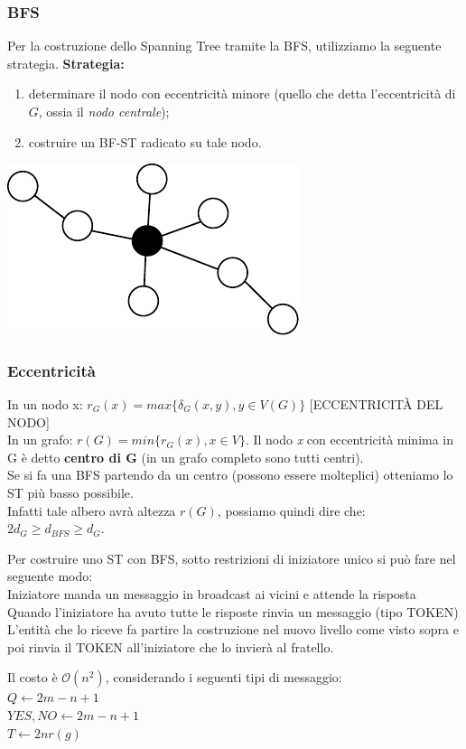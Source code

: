 \subsubsection{BFS}
Per la costruzione dello Spanning Tree tramite la BFS, utilizziamo la seguente
strategia.
\textbf{Strategia:}
\begin{enumerate}
    \item determinare il nodo con eccentricità minore (quello che detta
          l'eccentricità di $G$, ossia il \textit{nodo centrale});
    \item costruire un BF-ST radicato su tale nodo.
\end{enumerate}

\begin{center}
    \includegraphics[scale=1]{capitoli/costruzione-spanning-tree/imgs/n_24}
\end{center}

\subsubsection{Eccentricità}
In un nodo x: $r_G(x) = max\{ \delta_G(x,y), y \in V(G) \}$ [ECCENTRICITÀ
        DEL NODO]\\
In un grafo: $r(G) = min \{ r_G(x), x \in V \}$. Il nodo \emph{x} con
eccentricità minima in G è detto \textbf{centro di G} (in un grafo completo sono
tutti centri).\\

Se si fa una BFS partendo da un centro (possono essere molteplici) otteniamo lo
ST più basso possibile.\\
Infatti tale albero avrà altezza $r(G)$, possiamo quindi dire che: $2 d_G \geq
    d_{BFS} \geq d_G$.

Per costruire uno ST con BFS, sotto restrizioni di iniziatore unico si può fare
nel seguente modo:\\
Iniziatore manda un messaggio in broadcast ai vicini e attende la risposta\\
Quando l'iniziatore ha avuto tutte le risposte rinvia un messaggio (tipo
TOKEN)\\
L'entità che lo riceve fa partire la costruzione nel nuovo livello come visto
sopra e poi rinvia il TOKEN all'iniziatore che lo invierà al fratello.

Il costo è $\mathcal{O}(n^2)$, considerando i seguenti tipi di messaggio:\\
$Q \leftarrow 2m - n +1$\\
$YES, NO \leftarrow 2m -n +1$\\
$T \leftarrow 2n r(g)$
